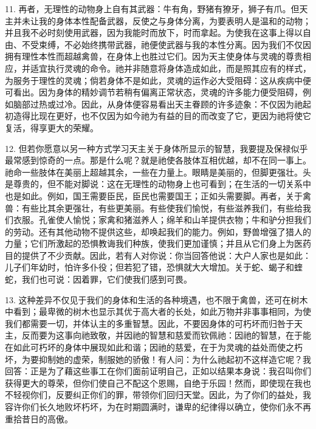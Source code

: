 11. 再者，无理性的动物身上自有其武器：牛有角，野猪有獠牙，狮子有爪。但天主并未让我的身体本性配备武器，反使之与身体分离，为要表明人是温和的动物；并且我不必时刻使用武器，因为我能时而放下，时而拿起。为使我在这事上得以自由、不受束缚，不必始终携带武器，祂便使武器与我的本性分离。因为我们不仅因拥有理性本性而超越禽兽，在身体上也胜过它们。因为天主使身体与灵魂的尊贵相应，并适宜执行灵魂的命令。祂并非随意将身体造成如此，而是照其应有的样式，为服务于理性的灵魂；倘若身体不是如此，灵魂的运作必大受阻碍：这从疾病中便可看出。因为身体的精妙调节若稍有偏离正常状态，灵魂的许多能力便受阻碍，例如脑部过热或过冷。因此，从身体便容易看出天主眷顾的许多迹象：不仅因为祂起初造得比现在更好，也不仅因为如今祂为有益的目的而改变了它，更因为祂将使它复活，得享更大的荣耀。\par

12. 但若你愿意以另一种方式学习天主关于身体所显示的智慧，我要提及保禄似乎最常感到惊奇的一点。那是什么呢？就是祂使各肢体互相优越，却不在同一事上。祂命一些肢体在美丽上超越其余，一些在力量上。眼睛是美丽的，但脚更强壮。头是尊贵的，但不能对脚说：这在无理性的动物身上也可看到；在生活的一切关系中也是如此。例如，国王需要臣民，臣民也需要国王；正如头需要脚。再者，关于禽兽：有些比其余更强壮，有些更美丽。有些使我们愉悦，有些滋养我们，有些给我们衣服。孔雀使人愉悦；家禽和猪滋养人；绵羊和山羊提供衣物；牛和驴分担我们的劳动。还有其他动物不提供这些，却唤起我们的能力。例如，野兽增强了猎人的力量；它们所激起的恐惧教诲我们种族，使我们更加谨慎；并且从它们身上为医药目的提供了不少贡献。因此，若有人对你说：你当回答他说：大户人家也是如此：儿子们年幼时，怕许多仆役；但若犯了错，恐惧就大大增加。关于蛇、蝎子和蝰蛇，我们也可说：因着罪，它们使我们感到可畏。\par

13. 这种差异不仅见于我们的身体和生活的各种境遇，也不限于禽兽，还可在树木中看到；最卑微的树木也显示其优于高大者的长处，如此万物并非事事相同，为使我们都需要一切，并体认主的多重智慧。因此，不要因身体的可朽坏而归咎于天主，反而要为这事向祂致敬，并因祂的智慧和慈爱而钦佩祂：因祂的智慧，在于能在如此可朽坏的身体中展现如此和谐；因祂的慈爱，在于为灵魂的益处而使之朽坏，为要抑制她的虚荣，制服她的骄傲！有人问：为什么祂起初不这样造它呢？我回答：正是为了藉这些事工在你们面前证明自己，正如以结果本身说：我召叫你们获得更大的尊荣，但你们使自己不配这个恩赐，自绝于乐园！然而，即使现在我也不轻视你们，反要纠正你们的罪，带领你们回归天堂。因此，为了你们的益处，我容许你们长久地败坏朽坏，为在时期圆满时，谦卑的纪律得以确立，使你们永不再重拾昔日的高傲。\par

